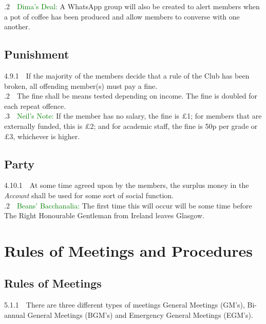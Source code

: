 \documentclass[a4paper,11pt]{article}
\begin{document}
.2$\quad$\textcolor{green}{Dima's Deal:} A WhatsApp group will also be created to alert members when a pot of coffee has been produced and allow members to converse with one another.\\

\subsection{Punishment}
\label{Punishment}
4.9.1$\quad$If the majority of the members decide that a rule of the Club has been broken, all offending member(s) must pay a fine. \\

.2$\quad$The fine shall be means tested depending on income. The fine is doubled for each repeat offence.\\   

.3$\quad$\textcolor{green}{Neil's Note:} If the member has no salary, the fine is $\pounds$1; for members that are externally funded, this is $\pounds$2; and for academic staff, the fine is 50p per grade or $\pounds$3, whichever is higher.

\subsection{Party}
4.10.1$\quad$At some time agreed upon by the members, the surplus money in the \textit{Account} shall be used for some sort of social function.\\

.2$\quad$\textcolor{green}{Beans' Bacchanalia:} The first time this will occur will be some time before The Right Honourable Gentleman from Ireland leaves Glasgow. 

\section{Rules of Meetings and Procedures}
\subsection{Rules of Meetings}
\label{Rules of Meetings}
5.1.1$\quad$There are three different types of meetings General Meetings (GM's), Bi-annual General Meetings (BGM's) and Emergency General Meetings (EGM's).\\ 
\end{document}
